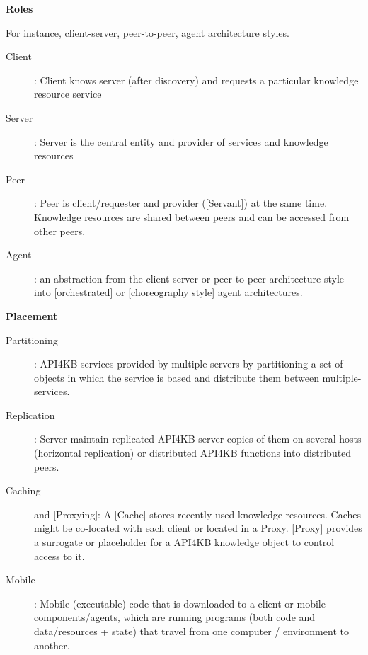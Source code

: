 \documentclass[runningheads]{llncs}
\begin{document}
\textbf{Roles}

For instance, client-server, peer-to-peer, agent architecture styles.

\begin{description}
    \item [Client]: Client knows server (after discovery) and requests a particular knowledge resource service
    \item [Server]: Server is the central entity and provider of services and knowledge resources
    \item [Peer]: Peer is client/requester and provider ([Servant]) at the same time. Knowledge resources are shared between peers and can be accessed from other peers.
    \item [Agent]: an abstraction from the client-server or peer-to-peer architecture style into [orchestrated] or [choreography style] agent architectures.
\end{description}

\textbf{Placement}

\begin{description}
    \item [Partitioning]: API4KB services provided by multiple servers by partitioning a set of objects in which the service is based and distribute them between multiple-services.
    \item [Replication]: Server maintain replicated API4KB server copies of them on several hosts (horizontal replication) or distributed API4KB functions into distributed peers.
    \item [Caching] and [Proxying]: A [Cache] stores recently used knowledge resources. Caches might be co-located with each client or located in a Proxy. [Proxy] provides a surrogate or placeholder for a API4KB knowledge object to control access to it. 
    \item [Mobile]: Mobile (executable) code that is downloaded to a client or mobile components/agents, which are running programs (both code and data/resources + state) that travel from one computer / environment to another.
\end{description}
\end{document}

